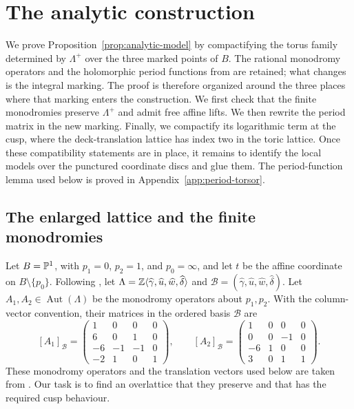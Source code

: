 \section{The analytic construction}\label{sec:analytic-construction}

We prove Proposition~\ref{prop:analytic-model} by compactifying the torus
family determined by $\Lambda^+$ over the three marked points of $B$.
The rational monodromy operators and the holomorphic period functions from
\citep[Sections~2--3]{Alpoge2026} are retained; what changes is the integral
marking.  The proof is therefore organized around the three places where
that marking enters the construction.  We first check that the finite
monodromies preserve $\Lambda^+$ and admit free affine lifts.  We then
rewrite the period matrix in the new marking.  Finally, we compactify its
logarithmic term at the cusp, where the deck-translation lattice has index
two in the toric lattice.  Once these compatibility statements are in
place, it remains to identify the local models over the punctured coordinate
discs and glue them.  The period-function lemma used below is proved in
Appendix~\ref{app:period-torsor}.

\subsection{The enlarged lattice and the finite monodromies}

Let $B=\mathbb P^1$, with $p_1=0$, $p_2=1$, and $p_0=\infty$, and let
$t$ be the affine coordinate on $B\setminus\{p_0\}$.  Following
\citep[Section~2.1]{Alpoge2026}, let
$\Lambda=\mathbb Z\langle\widehat\gamma,\widehat u,\widehat w,
\widehat\delta\rangle$ and
$\mathcal B=(\widehat\gamma,\widehat u,\widehat w,\widehat\delta)$.
Let $A_1,A_2\in\operatorname{Aut}(\Lambda)$ be the monodromy operators
about $p_1,p_2$.  With the column-vector convention, their matrices in
the ordered basis $\mathcal B$ are
\begin{equation}\label{eq:an-original-monodromy-matrices}
 [A_1]_{\mathcal B}=
 \begin{pmatrix}
 1&0&0&0\\
 6&0&1&0\\
 -6&-1&-1&0\\
 -2&1&0&1
 \end{pmatrix},
 \qquad
 [A_2]_{\mathcal B}=
 \begin{pmatrix}
 1&0&0&0\\
 0&0&-1&0\\
 -6&1&0&0\\
 3&0&1&1
 \end{pmatrix}.
\end{equation}
These monodromy operators and the translation vectors used below are taken
from \citep[Lemmas~2.4 and~2.6]{Alpoge2026}.  Our task is to find an
overlattice that they preserve and that has the required cusp behaviour.


